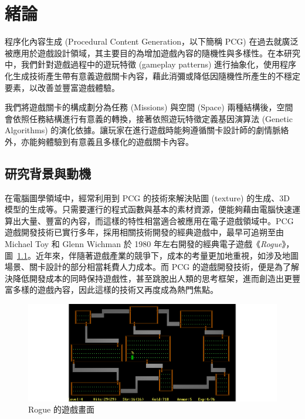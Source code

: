 \chapter{緒論}
\label{cha:intro}

程序化內容生成 (Procedural Content Generation，以下簡稱 PCG) 在過去就廣泛被應用於遊戲設計領域，其主要目的為增加遊戲內容的隨機性與多樣性。在本研究中，我們針對遊戲過程中的遊玩特徵 (gameplay patterns) 進行抽象化，使用程序化生成技術產生帶有意義遊戲關卡內容，藉此消彌或降低因隨機性所產生的不穩定要素，以改善並豐富遊戲體驗。

我們將遊戲關卡的構成劃分為任務 (Missions) 與空間 (Space) 兩種結構後，空間會依照任務結構進行有意義的轉換，接著依照遊玩特徵定義基因演算法 (Genetic Algorithms) 的演化依據。讓玩家在進行遊戲時能夠遵循關卡設計師的劇情脈絡外，亦能夠體驗到有意義且多樣化的遊戲關卡內容。

\section{研究背景與動機}

在電腦圖學領域中，經常利用到 PCG 的技術來解決貼圖 (texture) 的生成、3D 模型的生成等。只需要運行的程式函數與基本的素材資源，便能夠藉由電腦快速運算出大量、豐富的內容，而這樣的特性相當適合被應用在電子遊戲領域中。PCG 遊戲開發技術已實行多年，採用相關技術開發的經典遊戲中，最早可追朔至由 Michael Toy 和 Glenn Wichman 於 1980 年左右開發的經典電子遊戲《\textit{Rogue}》，圖~\ref{fig:rogue-gameshot}。近年來，伴隨著遊戲產業的競爭下，成本的考量更加地重視，如涉及地圖場景、關卡設計的部分相當耗費人力成本。而 PCG 的遊戲開發技術，便是為了解決降低開發成本的同時保持遊戲性，甚至跳脫出人類的思考框架，進而創造出更豐富多樣的遊戲內容，因此這樣的技術又再度成為熱門焦點。

\begin{figure}[!htb]
  \begin{center}
    \includegraphics[width=1.0\textwidth]{figures/rogue-gameshot.png}
    \caption{Rogue 的遊戲畫面} 
    \label{fig:rogue-gameshot}
  \end{center}
\end{figure}

